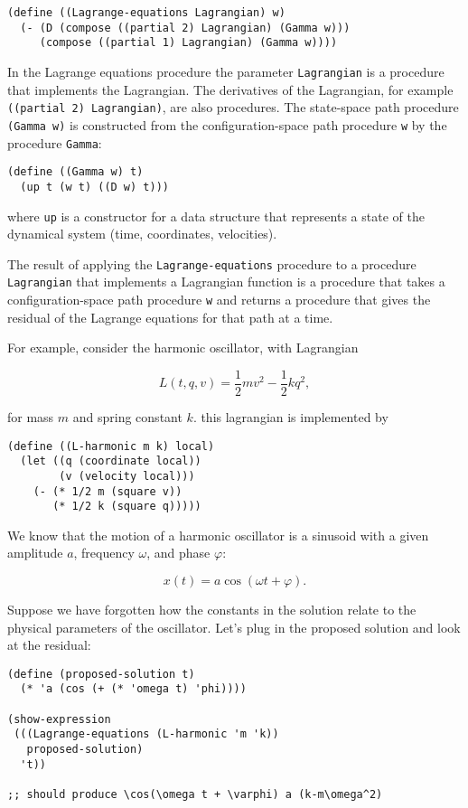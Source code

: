 \documentclass[11pt]{article}
\begin{document}
\begin{verbatim}
(define ((Lagrange-equations Lagrangian) w)
  (- (D (compose ((partial 2) Lagrangian) (Gamma w)))
     (compose ((partial 1) Lagrangian) (Gamma w))))
\end{verbatim}

In the Lagrange equations procedure the parameter \texttt{Lagrangian} is a procedure
that implements the Lagrangian. The derivatives of the Lagrangian, for example
\texttt{((partial 2) Lagrangian)}, are also procedures. The state-space path procedure
\texttt{(Gamma w)} is constructed from the configuration-space path procedure \texttt{w} by
the procedure \texttt{Gamma}:

\begin{verbatim}
(define ((Gamma w) t)
  (up t (w t) ((D w) t)))
\end{verbatim}

where \texttt{up} is a constructor for a data structure that represents a state of the
dynamical system (time, coordinates, velocities).

The result of applying the \texttt{Lagrange-equations} procedure to a procedure
\texttt{Lagrangian} that implements a Lagrangian function is a procedure that takes a
configuration-space path procedure \texttt{w} and returns a procedure that gives the
residual of the Lagrange equations for that path at a time.

For example, consider the harmonic oscillator, with Lagrangian

$$L(t, q, v) = \frac{1}{2}mv^2 - \frac{1}{2}kq^2,$$

for mass \(m\) and spring constant \(k\). this lagrangian is implemented by

\begin{verbatim}
(define ((L-harmonic m k) local)
  (let ((q (coordinate local))
        (v (velocity local)))
    (- (* 1/2 m (square v))
       (* 1/2 k (square q)))))
\end{verbatim}

We know that the motion of a harmonic oscillator is a sinusoid with a given
amplitude \(a\), frequency \(\omega\), and phase \(\varphi\):

$$x(t) = a \cos(\omega t + \varphi).$$

Suppose we have forgotten how the constants in the solution relate to the
physical parameters of the oscillator. Let’s plug in the proposed solution and
look at the residual:

\begin{verbatim}
(define (proposed-solution t)
  (* 'a (cos (+ (* 'omega t) 'phi))))

(show-expression
 (((Lagrange-equations (L-harmonic 'm 'k))
   proposed-solution)
  't))

;; should produce \cos(\omega t + \varphi) a (k-m\omega^2)
\end{verbatim}
\end{document}
